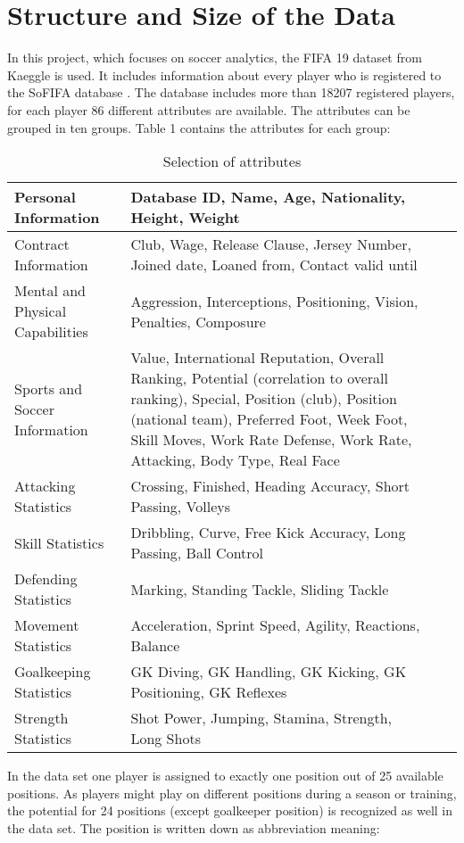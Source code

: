 \documentclass[runningheads]{llncs}
\begin{document}
\section{Structure and Size of the Data}
In this project, which focuses on soccer analytics, the FIFA 19 dataset from Kaeggle is used. It includes information about every player who is registered to the SoFIFA database \cite{ref_sofifa}. 
The database includes more than 18207 registered players, for each player 86 different attributes are available. The attributes can be grouped in ten groups. Table 1 contains the attributes for each group:
\begin{table}[h]
\begin{tabular}{p{3.5cm}|p{8.5cm}l|l}
\hline 
Personal Information & Database ID,  Name, Age, Nationality, Height, Weight\\
\hline 
Contract Information &  Club, Wage, Release Clause, Jersey Number, Joined date, Loaned from, Contact valid until \\
\hline 
 Mental and Physical Capabilities & Aggression, Interceptions, Positioning, Vision, Penalties, Composure\\
\hline
Sports and Soccer Information & Value, International Reputation, Overall Ranking, Potential (correlation to overall ranking), Special, Position (club), Position (national team), Preferred Foot, Week Foot, Skill Moves, Work Rate Defense, Work Rate, Attacking, Body Type,  Real Face \\
\hline
Attacking Statistics & Crossing, Finished, Heading Accuracy, Short Passing, Volleys \\
\hline
Skill Statistics & Dribbling, Curve, Free Kick Accuracy, Long Passing, Ball Control\\
\hline
Defending Statistics & Marking, Standing Tackle, Sliding Tackle\\
\hline
Movement Statistics & Acceleration, Sprint Speed, Agility, Reactions, Balance \\
\hline
Goalkeeping Statistics & GK Diving, GK Handling, GK Kicking, GK Positioning, GK Reflexes\\
\hline
Strength Statistics &  Shot Power, Jumping, Stamina, Strength, Long Shots\\
\hline
\end{tabular}
\label{tab:SelectionOfAttributes}
\caption{Selection of attributes}
\end{table}
In the data set one player is assigned to exactly one position out of 25 available positions. As players might play on different positions during a season or training, the potential for 24 positions (except goalkeeper position) is recognized as well in the data set. The position is written down as abbreviation meaning:
\end{document}
